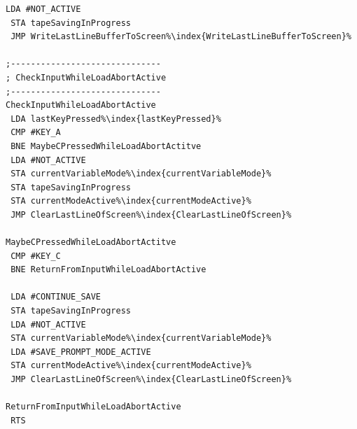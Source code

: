 \begin{minipage}[b]{0.33\linewidth}
\begin{lrbox}{\mybox}
\begin{lstlisting}[basicstyle=\ttfamily\tiny,escapechar=\%]
 LDA #NOT_ACTIVE
 STA tapeSavingInProgress
 JMP WriteLastLineBufferToScreen%\index{WriteLastLineBufferToScreen}%

;------------------------------
; CheckInputWhileLoadAbortActive
;------------------------------
CheckInputWhileLoadAbortActive
 LDA lastKeyPressed%\index{lastKeyPressed}%
 CMP #KEY_A
 BNE MaybeCPressedWhileLoadAbortActitve
 LDA #NOT_ACTIVE
 STA currentVariableMode%\index{currentVariableMode}%
 STA tapeSavingInProgress
 STA currentModeActive%\index{currentModeActive}%
 JMP ClearLastLineOfScreen%\index{ClearLastLineOfScreen}%

MaybeCPressedWhileLoadAbortActitve
 CMP #KEY_C
 BNE ReturnFromInputWhileLoadAbortActive

 LDA #CONTINUE_SAVE
 STA tapeSavingInProgress
 LDA #NOT_ACTIVE
 STA currentVariableMode%\index{currentVariableMode}%
 LDA #SAVE_PROMPT_MODE_ACTIVE
 STA currentModeActive%\index{currentModeActive}%
 JMP ClearLastLineOfScreen%\index{ClearLastLineOfScreen}%

ReturnFromInputWhileLoadAbortActive
 RTS
\end{lstlisting}
\end{lrbox}%
\scalebox{0.8}{\usebox{\mybox}}
\end{minipage}
